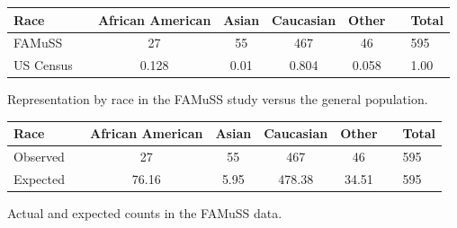 \textD{\newpage}

\begin{figure}[h]
	\centering
	\begin{tabular}{ll ccc c ll}
		\hline
		Race	 & \hspace{2mm} & African American & Asian & Caucasian & Other & \hspace{2mm} & Total \\
		\hline
		FAMuSS &	& 27 & 55 & 467 & 46 & & 595 \\
		US Census	 & 		& 0.128 & 0.01 & 0.804 & 0.058 & & 1.00 \\
		\hline
	\end{tabular}
	\caption{Representation by race in the FAMuSS study versus the general population.}
    \label{famussRacialProportions}
\end{figure}

\begin{figure}[h]
	\centering
	\begin{tabular}{ll ccc c ll}
		\hline
		Race	 & \hspace{2mm} & African American & Asian & Caucasian & Other & \hspace{2mm} & Total \\
		\hline
		Observed &	& 27 & 55 & 467 & 46 & & 595 \\
		Expected & 	& 76.16 & 5.95 & 478.38 & 34.51 & & 595 \\
		\hline
	\end{tabular}
	\caption{Actual and expected counts in the FAMuSS data.}
    \label{actualExpectedRacialCountsFamuss}
\end{figure}	



